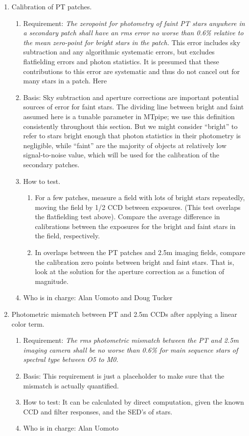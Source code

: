 \begin{enumerate}
\item Calibration of PT patches.
   \begin{enumerate}
   \item Requirement: {\it The zeropoint for photometry of faint PT stars anywhere
	in a secondary patch shall have an
	rms error no worse than 0.6\% relative to the mean zero-point for
	bright stars in the patch.}   This error includes sky subtraction
	and any
	algorithmic systematic errors, but excludes flatfielding errors and
	photon statistics.  It is presumed that these contributions to
	this error are systematic and
	thus do not cancel out for many stars in a patch. Here
   \item Basis: Sky subtraction and aperture corrections are important
potential sources of error for faint stars.  The dividing line between
bright and faint assumed here is a tunable parameter in MTpipe; we use
this definition consistently throughout this section.  But we might
consider ``bright'' to refer to stars bright enough that photon
statistics in their photometry is negligible, while ``faint'' are the
majority of objects at relatively low signal-to-noise value, which
will be used for the calibration of the secondary patches. 
   \item How to test.
	\begin{enumerate}
	\item For a few patches, measure a field with lots of bright
	   stars repeatedly, moving the field by 1/2 CCD between exposures.
	   (This test overlaps the flatfielding test above).  Compare
	   the average difference in calibrations between the
	   exposures for the bright and faint stars in the field,
	   respectively.  
	\item In overlaps between the PT patches and 2.5m imaging fields,
	   compare the calibration zero points between bright and faint stars.
	   That is, look at the solution for the aperture correction
	   as a function of magnitude. 
	\end{enumerate}
   \item Who is in charge: Alan Uomoto and Doug Tucker
   \end{enumerate}

\item Photometric mismatch between PT and 2.5m CCDs after applying
	a linear color term.

   \begin{enumerate}
   \item Requirement: {\it The rms photometric mismatch between the PT
	and 2.5m imaging camera shall be no worse than 0.6\% for
	main sequence stars of spectral type between O5 to M0.}
   \item Basis: This requirement is just a placeholder to make sure
	that the mismatch is actually quantified.  
   \item How to test: It can be calculated by direct computation,
	 given the known CCD and filter responses, and the SED's of stars.
   \item Who is in charge: Alan Uomoto
   \end{enumerate}


\end{enumerate}
